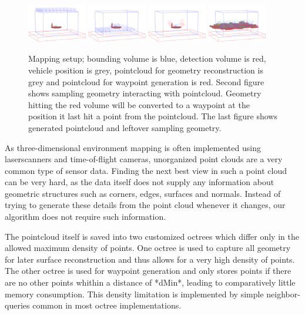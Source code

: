 \documentclass[letterpaper, 10 pt, conference]{ieeeconf}  %
\begin{document}
\begin{figure}[ht]
  \centering
    \includegraphics[width=0.23\textwidth]{images/expl1}
    \includegraphics[width=0.23\textwidth]{images/expl2}
    \includegraphics[width=0.23\textwidth]{images/expl3}
    \includegraphics[width=0.23\textwidth]{images/process5}
    \caption{Mapping setup; bounding volume is blue, detection volume is red, vehicle position is grey, pointcloud for geometry reconstruction is grey and pointcloud for waypoint generation is red. Second figure shows sampling geometry interacting with pointcloud. Geometry hitting the red volume will be converted to a waypoint at the position it last hit a point from the pointcloud. The last figure shows generated pointcloud and leftover sampling geometry.}
\end{figure}

As three-dimensional environment mapping is often implemented using laserscanners and time-of-flight cameras, unorganized point clouds are a very common type of sensor data. Finding the next best view in such a point cloud can be very hard, as the data itself does not supply any information about geometric structures such as corners, edges, surfaces and normals. Instead of trying to generate these details from the point cloud whenever it changes, our algorithm does not require such information.

The pointcloud itself is saved into two customized octrees which differ only in the allowed maximum density of points. One octree is used to capture all geometry for later surface reconstruction and thus allows for a very high density of points. The other octree is used for waypoint generation and only stores points if there are no other points whithin a distance of *dMin*, leading to comparatively little memory consumption. This density limitation is implemented by simple neighbor-queries common in most octree implementations.
\end{document}
